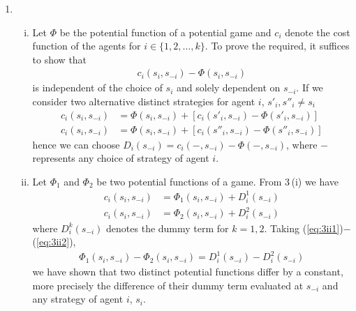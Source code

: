 \documentclass[a4paper,12pt]{article}
\theoremstyle{definition}
\begin{document}
\begin{enumerate}
\item
\begin{enumerate}[(i)]
\item Let $\Phi$ be the potential function of a potential game and $c_i$ denote the cost function of the agents for $i\in \{1,2,\ldots,k\}$. 
To prove the required, it suffices to show that 
\begin{align*}
c_i(s_i,s_{-i})-\Phi(s_i,s_{-i})
\end{align*}
is independent of the choice of $s_i$ and solely dependent on $s_{-i}$. If we consider two alternative distinct strategies for agent $i$, $s'_i, s''_i \neq s_i$
\begin{align*}
c_i(s_i,s_{-i})&=\Phi(s_i,s_{-i})+\left[c_i(s'_i,s_{-i})-\Phi(s'_i,s_{-i})\right]\\
c_i(s_i,s_{-i})&=\Phi(s_i,s_{-i})+\left[c_i(s''_i,s_{-i})-\Phi(s''_i,s_{-i})\right]
\end{align*} 
hence we can choose $D_i(s_{-i})=c_i(-,s_{-i})-\Phi(-,s_{-i})$, where $-$ represents any choice of strategy of agent $i$.

\item Let $\Phi_1$ and $\Phi_2$ be two potential functions of a game. From 3\,(i) we have
\begin{align}
c_i(s_i,s_{-i})&=\Phi_1(s_i,s_{-i})+D^1_i(s_{-i})\label{eq:3ii1}\\
c_i(s_i,s_{-i})&=\Phi_2(s_i,s_{-i})+D^2_i(s_{-i})\label{eq:3ii2}
\end{align}
where $D^k_i(s_{-i})$ denotes the dummy term for $k=1,2$. Taking (\ref{eq:3ii1})$-$(\ref{eq:3ii2}), 
 \begin{align*}
\Phi_1(s_i,s_{-i})-\Phi_2(s_i,s_{-i})=D^1_i(s_{-i})-D^2_i(s_{-i})
\end{align*}
we have shown that two distinct potential functions differ by a constant, more precisely the difference of their dummy term evaluated at $s_{-i}$ and any strategy of agent $i$, $s_i$.


\end{enumerate}
\end{enumerate}
\end{document}

